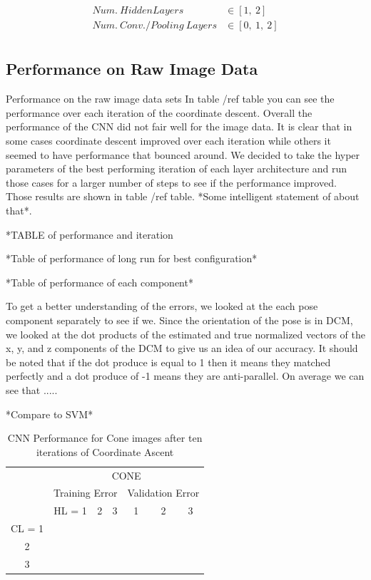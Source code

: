 \documentclass[journal]{IEEEtran}
\begin{document}
\begin{align*}
Num.\ Hidden Layers\  &\in [1,\ 2]\\
Num.\ Conv./Pooling\ Layers &\in [0,\ 1,\ 2]\\
\end{align*}


\subsection{Performance on Raw Image Data}



Performance on the raw image data sets In table /ref table you can see the performance over each iteration of the coordinate descent. Overall the performance of the CNN did not fair well for the image data. It is clear that in some cases coordinate descent improved over each iteration while others it seemed to have performance that bounced around. We decided to take the hyper parameters of the best performing iteration of each layer architecture and run those cases for a larger number of steps to see if the performance improved. Those results are shown in table /ref table. *Some intelligent statement of about that*. 

*TABLE of performance and iteration

*Table of performance of long run for best configuration*

*Table of performance of each component*

To get a better understanding of the errors, we looked at the each pose component separately to see if we. Since the orientation of the pose is in DCM, we looked at the dot products of the estimated  and true normalized vectors of the x, y, and z components of the DCM to give us an idea of our accuracy. It should be noted that if the dot produce is equal to 1 then it means they matched perfectly and a dot produce of -1 means they are anti-parallel. On average we can see that  .....

*Compare to SVM*

\begin{table}[h]
	\caption{CNN Performance for Cone images after ten iterations of Coordinate Ascent}
	\label{CNN_CONE_TABLE}
	\centering
	\begin{tabular}{|c|c|c|c||c|c|c|}
		\cline{2-7}
		\multicolumn{1}{c|}{} &	\multicolumn{6}{c|}{CONE}\\\cline{2-7}
		\multicolumn{1}{c|}{}&\multicolumn{3}{|c||}{Training Error}  &\multicolumn{3}{c|}{Validation Error} \\
		\cline{2-7}
		\multicolumn{1}{c|}{} & HL = 1 & 2 & 3 &1 & 2 & 3 \\
		\hline
		CL = 1	& & & 	& & & \\
		2	& & & & & & \\
		3	& & & & &  & \\
		\hline
		
		
	\end{tabular}
\end{table}
\end{document}
